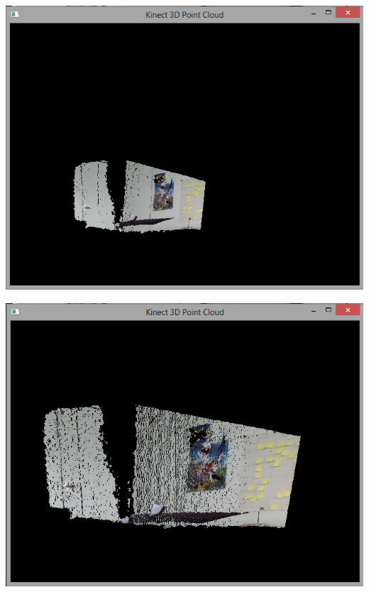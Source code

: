 \begin{center}
	\includegraphics[scale=0.7]{images/point_cloud_1.png}
\end{center}

\begin{center}
	\includegraphics[scale=0.7]{images/point_cloud_2.png}
\end{center}

